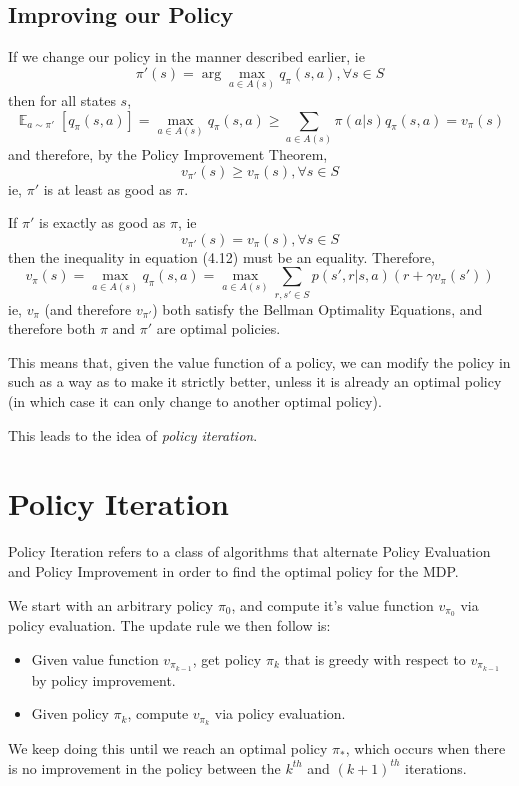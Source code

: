 \documentclass[12pt]{report}
\begin{document}
\subsection{Improving our Policy}
If we change our policy in the manner described earlier, ie 
\begin{equation}
    \pi'(s) = \arg\max\limits_{a \in A(s)} q_{\pi}(s, a), \forall s \in S
\end{equation}
then for all states $s$,
\begin{equation}
    \mathop{\mathbb{E}}_{a \sim \pi'}\left[q_{\pi}(s, a)\right] = \max\limits_{a \in A(s)} q_{\pi}(s, a) \geq \sum\limits_{a \in A(s)} \pi(a | s) q_{\pi}(s, a) = v_{\pi}(s)
\end{equation}
and therefore, by the Policy Improvement Theorem,
\begin{equation}
    v_{\pi'}(s) \geq v_{\pi}(s), \forall s \in S
\end{equation}
ie, $\pi'$ is at least as good as $\pi$.

If $\pi'$ is exactly as good as $\pi$, ie 
\begin{equation}
    v_{\pi'}(s) = v_{\pi}(s), \forall s \in S
\end{equation}
then the inequality in equation (4.12) must be an equality. Therefore, 
\begin{equation}
    v_{\pi}(s) = \max\limits_{a \in A(s)} q_{\pi}(s, a) = \max\limits_{a \in A(s)} \sum\limits_{r, s' \in S} p(s', r | s, a)(r + \gamma v_{\pi}(s'))
\end{equation}
ie, $v_{\pi}$ (and therefore $v_{\pi'}$) both satisfy the Bellman Optimality Equations, and therefore both $\pi$ and $\pi'$ are optimal policies.

This means that, given the value function of a policy, we can modify the policy in such as a way as to make it strictly better, unless it is already an optimal policy (in which case it can only change to another optimal policy).

This leads to the idea of \textit{policy iteration}.
\section{Policy Iteration}
Policy Iteration refers to a class of algorithms that alternate Policy Evaluation and Policy Improvement in order to find the optimal policy for the MDP.

We start with an arbitrary policy $\pi_{0}$, and compute it's value function $v_{\pi_{0}}$ via policy evaluation. The update rule we then follow is:
\begin{itemize}
    \item Given value function $v_{\pi_{k - 1}}$, get policy $\pi_{k}$ that is greedy with respect to $v_{\pi_{k - 1}}$ by policy improvement.
    \item Given policy $\pi_{k}$, compute $v_{\pi_{k}}$ via policy evaluation.
\end{itemize}
We keep doing this until we reach an optimal policy $\pi_{*}$, which occurs when there is no improvement in the policy between the $k^{th}$ and $(k + 1)^{th}$ iterations.
\end{document}
